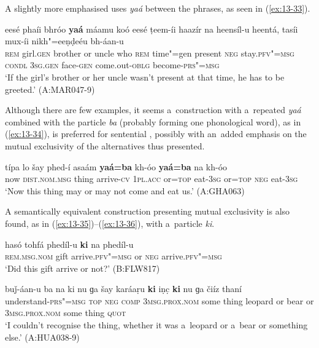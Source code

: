  A slightly more emphasised  uses \textit{yaá} between the phrases, as seen in (\ref{ex:13-33}).

\ea
\label{ex:13-33}
\gll eesé phaíi {\ob}bhróo \textbf{yaá} máamu{\cb} koó eesé ṭeem-íi haazír na heensíl-u heentá, tasíi mux-íi nikh"=eeṇḍeéu bh-áan-u \\
\textsc{rem} girl.\textsc{gen} brother or uncle who \textsc{rem} time"=gen  present \textsc{neg} stay.\textsc{pfv"=msg} \textsc{condl} \textsc{3sg.gen} face-\textsc{gen}  come.out-\textsc{oblg} become-\textsc{prs"=msg}  \\
\glt `If the girl's brother or her uncle wasn't present at that time, he has to be greeted.' (A:MAR047-9) 
\z

 Although there are few examples, it seems a~construction with a~repeated \textit{yaá} combined with the particle \textit{ba} (probably forming one phonological word), as in (\ref{ex:13-34}), is preferred for sentential , possibly with an~added emphasis on the mutual exclusivity of the alternatives thus presented. 

\begin{exe}
\ex
\label{ex:13-34}
\gll típa lo šay phed-í asaám {\ob}\textbf{yaá=ba} kh-óo \textbf{yaá=ba} na kh-óo{\cb} \\
now \textsc{dist.nom.msg} thing arrive-\textsc{cv} \textsc{1pl.acc} or=\textsc{top} eat-\textsc{3sg} or=\textsc{top} \textsc{neg} eat-\textsc{3sg} \\
\glt `Now this thing may or may not come and eat us.' (A:GHA063) 
\end{exe}

 A semantically equivalent construction presenting mutual exclusivity is also found, as in (\ref{ex:13-35})--(\ref{ex:13-36}), with a~particle \textit{ki}. 

\begin{exe}
\ex
\label{ex:13-35}
\gll hasó tohfá {\ob}phedíl-u \textbf{ki} na phedíl-u{\cb}\\
\textsc{rem.msg.nom} gift arrive.\textsc{pfv"=msg} or \textsc{neg}  arrive.\textsc{pfv"=msg} \\
\glt `Did this gift arrive or not?' (B:FLW817)

\ex
\label{ex:13-36}
\gll buǰ-áan-u ba na ki nu ɡa šay {\ob}karáaṛu \textbf{ki} iṇc̣ \textbf{ki} nu ɡa čiíz{\cb} thaní \\
understand-\textsc{prs"=msg} \textsc{top} \textsc{neg} \textsc{comp} \textsc{3msg.prox.nom}  some thing leopard or bear or \textsc{3msg.prox.nom} some thing \textsc{quot} \\
\glt `I couldn't recognise the thing, whether it was a~leopard or a~bear or something else.' (A:HUA038-9) 
\end{exe}


